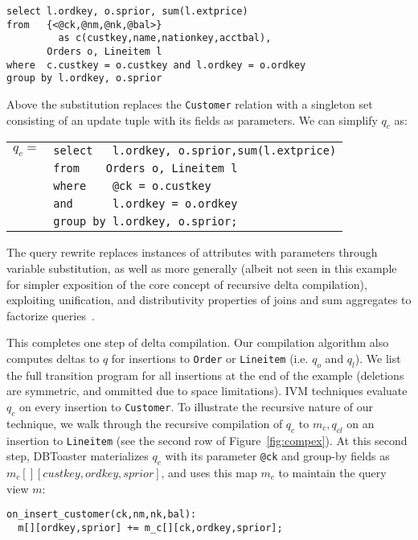 \begin{verbatim}
select l.ordkey, o.sprior, sum(l.extprice)
from   {<@ck,@nm,@nk,@bal>}
         as c(custkey,name,nationkey,acctbal),
       Orders o, Lineitem l
where  c.custkey = o.custkey and l.ordkey = o.ordkey
group by l.ordkey, o.sprior
\end{verbatim}

\noindent Above the substitution replaces the {\tt Customer} relation with a
singleton set consisting of an update tuple with its fields as parameters. We
can simplify $q_{c}$ as:

\def \ql#1{{\tt #1}}
\vspace{1mm}
\begin{tabular}{ll}
$q_c =$  & \ql{select\ \ \ l.ordkey, o.sprior,sum(l.extprice)}\\
        & \ql{from\ \ \ \ Orders o, Lineitem l}\\
        & \ql{where\ \ \ \ @ck = o.custkey}\\
        & \ql{and\ \ \ \ \ \ l.ordkey = o.ordkey}\\
        & \ql{group by l.ordkey, o.sprior;}
\end{tabular}

\vspace{1mm}
The query rewrite replaces instances of attributes with parameters through
variable substitution, as well as more generally (albeit not seen in this
example for simpler exposition of the core concept of recursive delta
compilation), exploiting unification, and distributivity properties of joins and
sum aggregates to factorize queries~\cite{koch-pods:10}.

This completes one step of delta compilation. Our compilation algorithm also
computes deltas to $q$ for insertions to {\tt Order} or {\tt Lineitem} (i.e.
$q_{o}$ and $q_{l}$). We list the full transition program for all insertions at
the end of the example (deletions are symmetric, and ommitted due to space
limitations).
IVM techniques evaluate $q_{c}$ on every insertion to {\tt Customer}. To
illustrate the recursive nature of our technique, we walk through the recursive compilation
of $q_c$ to $m_c,q_{cl}$ on an insertion to {\tt Lineitem} (see the second row
of Figure~\ref{fig:compex}). At this second step, DBToaster materializes $q_c$
with its parameter {\tt @ck} and group-by fields as
$m_c[][custkey,ordkey,sprior]$, and uses this map $m_c$ to maintain the query
view $m$:

{\footnotesize
\begin{verbatim}
on_insert_customer(ck,nm,nk,bal):
  m[][ordkey,sprior] += m_c[][ck,ordkey,sprior];
\end{verbatim}
}

